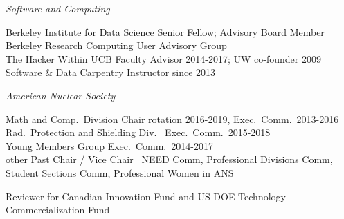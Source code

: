 \vspace*{-.4em}
\textit{Software and Computing}
\vspace*{-.4em}
\begin{tabbing}
\hspace*{1 em}\=\href{http://bids.berkeley.edu/}{Berkeley Institute for Data Science} \hspace*{2.5 em}\= Senior Fellow; Advisory Board Member\\
%
\>\href{http://research-it.berkeley.edu/programs/berkeley-research-computing}{Berkeley Research Computing} \> User Advisory Group\\
%
%
\> \href{http://thehackerwithin.github.io/berkeley/}{The Hacker Within}  \> UCB Faculty Advisor 2014-2017; UW co-founder 2009\\
%
\> \href{http://software-carpentry.org/}{Software \& Data Carpentry}  \> Instructor since 2013%
%
\end{tabbing}
%
\vspace*{-.4em}
\textit{American Nuclear Society}
\vspace*{-.5em}
\begin{tabbing}
\hspace*{1 em}\= Math and Comp.\ Division \hspace*{6em} \= Chair rotation 2016-2019, Exec.\ Comm.\ 2013-2016 \\
%
\> Rad.\ Protection and Shielding Div.\ \> Exec.\ Comm.\ 2015-2018\\
%
\> Young Members Group \> Exec.\ Comm.\ 2014-2017\\
%
\> other Past Chair / Vice Chair\ \> NEED Comm, Professional Divisions Comm, \\ \> \> Student Sections Comm, Professional Women in ANS %
%
%
%
%
%
\end{tabbing}

\vspace*{-.4em}

Reviewer for Canadian Innovation Fund and US DOE Technology Commercialization Fund



